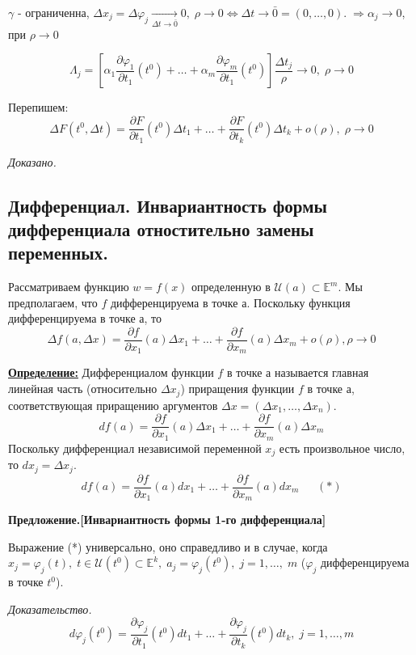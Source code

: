 \documentclass[a4paper,12pt]{article} %
\begin{document}
 $\gamma$ - ограниченна, $\Delta x_j = \Delta \varphi_j \xrightarrow[\Delta t \to \bar 0 ]{} 0,\;
 \rho \to 0 \Leftrightarrow \Delta t \to \bar0 = (0, \ldots, 0). \; \Rightarrow \alpha_j \to 0$, при $\rho \to 0$
 
 \[\Lambda_j = [\alpha_1\frac{\partial \varphi_1}{\partial t_1}(t^0) + \ldots + \alpha_m \frac{\partial \varphi_m}{\partial t_1}(t^0)]\frac{\Delta t_j}{\rho} \to 0, \; \rho \to 0\]
 
 Перепишем:
 \[\Delta F(t^0, \Delta t) = \frac{\partial F}{\partial t_1}(t^0)\Delta t_1 + \ldots + \frac{\partial F}{\partial t_k}(t^0)\Delta t_k + o(\rho), \; \rho \to 0\]
 
 \textit{Доказано.}
 
 \subsection{Дифференциал. Инвариантность формы дифференциала отностительно замены переменных.}
 
 Рассматриваем функцию $w = f(x)$ определенную в $\mathscr{U}(a) \subset \mathds{E}^m$. Мы предполагаем, что $f$ дифференцируема в точке а. Поскольку функция дифференцируема в точке а, то \[\Delta f(a, \Delta x) = \frac{\partial f}{\partial x_1}(a)\Delta x_1 + \ldots + \frac{\partial f}{\partial x_m}(a) \Delta x_m + o(\rho), \rho \to 0\]
 
 \underline{\textbf{Определение:}} Дифференциалом функции $f$ в точке а называется главная линейная часть (относительно $\Delta x_j$) приращения функции $f$ в точке а, соответствующая приращению аргументов $\Delta x = (\Delta x_1, \ldots, \Delta x_n)$.
 \[df(a) = \frac{\partial f}{\partial x_1}(a)\Delta x_1 + \ldots + \frac{\partial f}{\partial x_m}(a)\Delta x_m\]
 Поскольку дифференциал независимой переменной $x_j$ есть произвольное число, то $dx_j = \Delta x_j$.
 \[df(a) = \frac{\partial f}{\partial x_1}(a)dx_1 + \ldots + \frac{\partial f}{\partial x_m}(a)dx_m ~~~~~~~(*)\]
 
 \textbf{Предложение.[Инвариантность формы 1-го дифференциала]} 
 
 Выражение (*) универсально, оно справедливо и в случае, когда $x_j = \varphi_j(t), \; t \in \mathscr{U}(t^0) \subset \mathds{E}^k, \; a_j = \varphi_j(t^0), \; j = 1, \ldots, \; m$ ($\varphi_j$ дифференцируема в точке $t^0$).
 
 \textit{Доказательство.}
 \[d\varphi_j(t^0) = \frac {\partial \varphi_j}{\partial t_1}(t^0)dt_1 + \ldots + \frac {\partial \varphi_j}{\partial t_k}(t^0)dt_k, \; j = 1, \ldots, m\]
 
\end{document}
